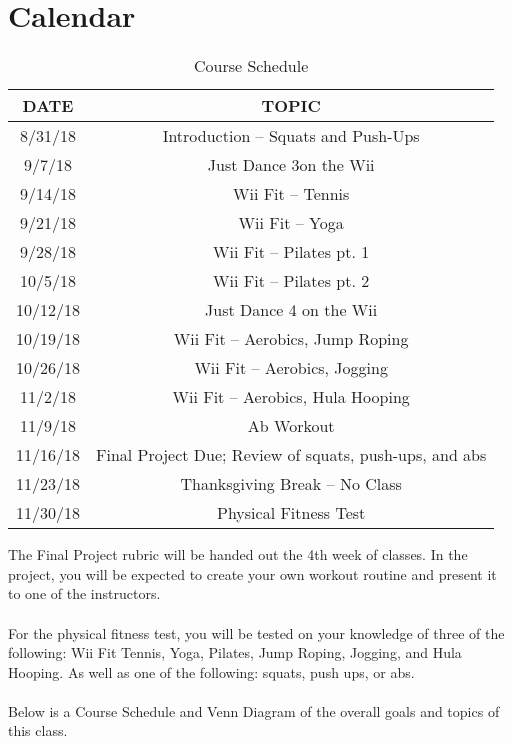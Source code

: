 \documentclass[letterpaper,12pt]{article}
\begin{document}
\section{Calendar}
\begin{table}[ht]
\begin{center}
\caption{Course Schedule}
\label{tbl:bins} %
\begin{tabular}{|cc|} 
\hline
\multicolumn{1}{|c}{DATE} & \multicolumn{1}{c|}{TOPIC} \\
\hline
8/31/18 &   Introduction -- Squats and Push-Ups \\
9/7/18 &   Just Dance 3on the Wii \\
9/14/18 &   Wii Fit -- Tennis \\
9/21/18 &   Wii Fit -- Yoga \\
9/28/18 &   Wii Fit -- Pilates pt. 1\\
10/5/18 &   Wii Fit -- Pilates pt. 2\\
10/12/18 &  Just Dance 4 on the Wii\\
10/19/18 &  Wii Fit -- Aerobics, Jump Roping \\
10/26/18 &  Wii Fit -- Aerobics, Jogging \\
11/2/18 &   Wii Fit -- Aerobics, Hula Hooping \\
11/9/18 &   Ab Workout \\
11/16/18 &  Final Project Due; Review of squats, push-ups, and abs \\
11/23/18 &  Thanksgiving Break -- No Class \\
11/30/18 &  Physical Fitness Test \\
\hline
\end{tabular}
\end{center}
\end{table}

The Final Project rubric will be handed out the 4th week of classes. In the project, you will be expected to create your own workout routine and present it to one of the instructors.\\
\\
For the physical fitness test, you will be tested on your knowledge of three of the following: Wii Fit Tennis, Yoga, Pilates, Jump Roping, Jogging, and Hula Hooping. As well as one of the following: squats, push ups, or abs. \\
\\
Below is a Course Schedule and Venn Diagram of the overall goals and topics of this class. 

\end{document}
